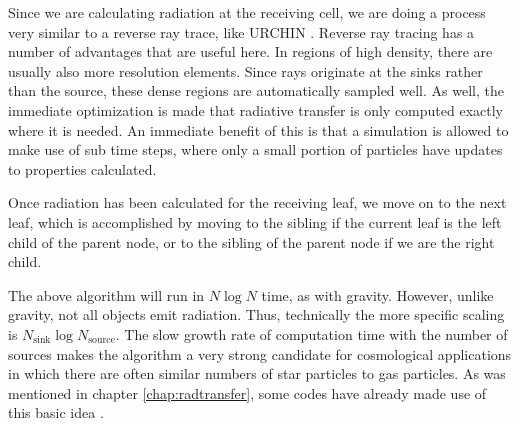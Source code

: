 Since we are calculating radiation at the receiving cell, we are doing a process very similar to a reverse ray trace, like URCHIN \citep{altayTheuns13}. Reverse ray tracing has a number of advantages that are useful here. In regions of high density, there are usually also more resolution elements. Since rays originate at the sinks rather than the source, these dense regions are automatically sampled well. As well, the immediate optimization is made that radiative transfer is only computed exactly where it is needed. An immediate benefit of this is that a simulation is allowed to make use of sub time steps, where only a small portion of particles have updates to properties calculated.

Once radiation has been calculated for the receiving leaf, we move on to the next leaf, which is accomplished by moving to the sibling if the current leaf is the left child of the parent node, or to the sibling of the parent node if we are the right child.

The above algorithm will run in $N\log{N}$ time, as with gravity. However, unlike gravity, not all objects emit radiation. Thus, technically the more specific scaling is $N_{\mbox{sink}}\log{N_{\mbox{source}}}$. The slow growth rate of computation time with the number of sources makes the algorithm a very strong candidate for cosmological applications in which there are often similar numbers of star particles to gas particles. As was mentioned in chapter \ref{chap:radtransfer}, some codes have already made use of this basic idea \citep{gnedinAbel01,hopkins, kannanEt14}.



